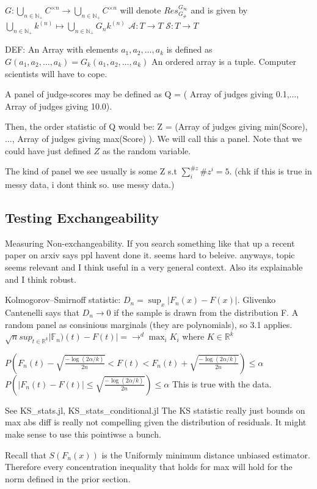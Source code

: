 \documentclass{article}
\begin{document}
$G:\bigcup_{n\in\mathbb{N_+}} C^{\times n}\rightarrow \bigcup_{n\in\mathbb{N_+}} C^{\times n} $ will denote $Res^{G_\infty}_{G_\#}$ and is given by $\bigcup_{n\in \mathbb{N_+}} k^{(n)} \mapsto \bigcup_{n\in \mathbb{N_+}} G_nk^{(n)}$
$\mathcal{A}:T\rightarrow T$
$\mathcal{S}:T\rightarrow T$

DEF: An Array with elements $a_1,a_2,\dots,a_k $ is defined as $G(a_1,a_2,\dots,a_k) = G_k(a_1,a_2,\dots,a_k) $
An ordered array is a tuple. Computer scientists will have to cope.

A panel of judge-scores may be defined as Q = ( Array of judges giving 0.1,$ \dots$, Array of judges giving 10.0).

Then, the order statistic of Q would be: Z = (Array of judges giving min(Score),$\dots$, Array of judges giving max(Score) ). We will call this a panel. Note that we could have just defined $Z$ as the random variable.

The kind of panel we see usually is some Z s.t $\sum_i^{\#z} \#z^i = 5 $.
(chk if this is true in messy data, i dont think so. use messy data.)

\subsection{Testing Exchangeability}
Measuring Non-exchangeability. If you search something like that up a recent paper on arxiv says ppl havent done it. seems hard to beleive. anyways, topic seems relevant and I think useful in a very general context. Also its explainable and I think robust.

\cite{Naaman21}
Kolmogorov–Smirnoff statistic: $D_n = \sup_x |F_n(x) - F(x)| $.
Glivenko Cantenelli says that $D_n \rightarrow 0$ if the sample is drawn from the distribution F.
A random panel as consinious marginals (they are polynomials), so 3.1 applies.
$\sqrt{n} sup_{t\in \mathbb{R}^k}| \mathbb{F}_n)(t) - F(t) | = \rightarrow^d \max_i K_i$ where $K\in \mathbb{R}^k$

$P( F_n(t) - \sqrt{\frac{-\log(2\alpha/ k)}{2n}} < F(t) < F_n(t) + \sqrt{\frac{-\log(2\alpha/k)}{2n}} ) \leq \alpha $ 
$P( |F_n(t) - F(t)|\leq \sqrt{\frac{-\log(2\alpha/ k)}{2n}} ) \leq \alpha $ 
This is true with the data.

See KS_stats.jl, KS_stats_conditional.jl
The KS statistic really just bounds on max abs diff is really not compelling given the distribution of residuals. It might make sense to use this pointiwse a bunch.

Recall that  $S(F_n(x))$ is the Uniformly minimum distance unbiased estimator. Therefore every concentration inequality that holds for max will hold for the norm defined in the prior section.
\end{document}
